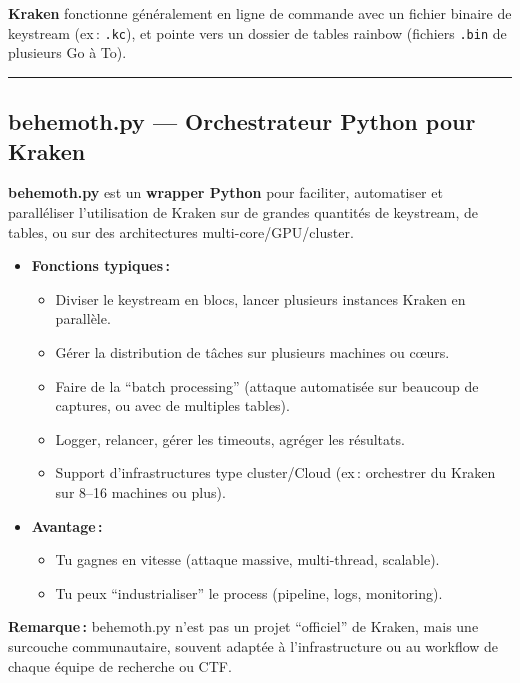 \documentclass[
  french,
]{article}
\providecommand{\tightlist}{%
  \setlength{\itemsep}{0pt}\setlength{\parskip}{0pt}}
\begin{document}
\textbf{Kraken} fonctionne généralement en ligne de commande avec un
fichier binaire de keystream (ex\,: \texttt{.kc}), et pointe vers un
dossier de tables rainbow (fichiers \texttt{.bin} de plusieurs Go à To).

\begin{center}\rule{0.5\linewidth}{0.5pt}\end{center}

\subsection{behemoth.py --- Orchestrateur Python pour
Kraken}\label{behemoth.py-orchestrateur-python-pour-kraken}

\textbf{behemoth.py} est un \textbf{wrapper Python} pour faciliter,
automatiser et paralléliser l'utilisation de Kraken sur de grandes
quantités de keystream, de tables, ou sur des architectures
multi-core/GPU/cluster.

\begin{itemize}
\item
  \textbf{Fonctions typiques\,:}

  \begin{itemize}
  \tightlist
  \item
    Diviser le keystream en blocs, lancer plusieurs instances Kraken en
    parallèle.
  \item
    Gérer la distribution de tâches sur plusieurs machines ou cœurs.
  \item
    Faire de la ``batch processing'' (attaque automatisée sur beaucoup
    de captures, ou avec de multiples tables).
  \item
    Logger, relancer, gérer les timeouts, agréger les résultats.
  \item
    Support d'infrastructures type cluster/Cloud (ex\,: orchestrer du
    Kraken sur 8--16 machines ou plus).
  \end{itemize}
\item
  \textbf{Avantage\,:}

  \begin{itemize}
  \tightlist
  \item
    Tu gagnes en vitesse (attaque massive, multi-thread, scalable).
  \item
    Tu peux ``industrialiser'' le process (pipeline, logs, monitoring).
  \end{itemize}
\end{itemize}

\textbf{Remarque\,:} behemoth.py n'est pas un projet ``officiel'' de
Kraken, mais une surcouche communautaire, souvent adaptée à
l'infrastructure ou au workflow de chaque équipe de recherche ou CTF.
\end{document}
